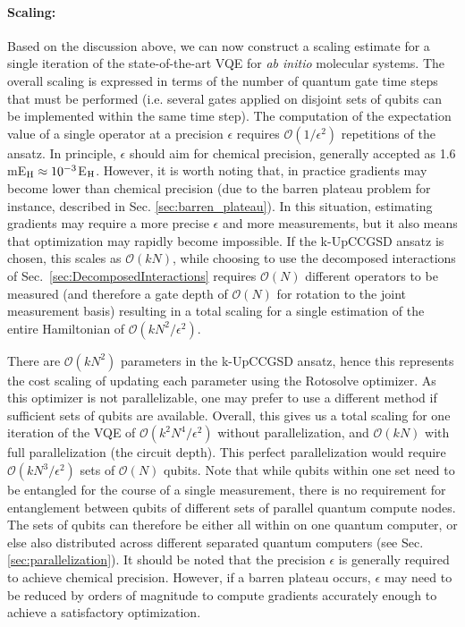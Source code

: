 \paragraph{Scaling:} Based on the discussion above, we can now construct a scaling estimate for a single iteration of the state-of-the-art VQE for \textit{ab initio} molecular systems. The overall scaling is expressed in terms of the number of quantum gate time steps that must be performed (i.e. several gates applied on disjoint sets of qubits can be implemented within the same time step). The computation of the expectation value of a single operator at a precision $\epsilon$ requires $\mathcal{O}(1/\epsilon^2)$ repetitions of the ansatz. In principle, $\epsilon$ should aim for chemical precision, generally accepted as 1.6 mE$_{\rm H} \approx 10^{-3} $E$_{\rm H}$. However, it is worth noting that, in practice gradients may become lower than chemical precision (due to the barren plateau problem for instance, described in Sec. \ref{sec:barren_plateau}). In this situation, estimating gradients may require a more precise $\epsilon$ and more measurements, but it also means that optimization may rapidly become impossible.  
If the k-UpCCGSD ansatz is chosen, this scales as $\mathcal{O}(kN)$, while choosing to use the decomposed interactions of Sec.~\ref{sec:DecomposedInteractions} requires $\mathcal{O}(N)$ different operators to be measured (and therefore a gate depth of $\mathcal{O}(N)$ for rotation to the joint measurement basis) resulting in a total scaling for a single estimation of the entire Hamiltonian of $\mathcal{O}(kN^2/\epsilon^2)$. 

There are $\mathcal{O}(kN^2)$ parameters in the k-UpCCGSD ansatz, hence this represents the cost scaling of updating each parameter using the Rotosolve optimizer. As this optimizer is not parallelizable, one may prefer to use a different method if sufficient sets of qubits are available. Overall, this gives us a total scaling for one iteration of the VQE of $\mathcal{O}(k^2N^4/\epsilon^2)$ without parallelization, and $\mathcal{O}(kN)$ with full parallelization (the circuit depth). This perfect parallelization would require $\mathcal{O}(kN^3/\epsilon^2)$ sets of $\mathcal{O}(N)$ qubits. Note that while qubits within one set need to be entangled for the course of a single measurement, there is no requirement for entanglement between qubits of different sets of parallel quantum compute nodes. The sets of qubits can therefore be either all within on one quantum computer, or else also distributed across different separated quantum computers (see Sec. \ref{sec:parallelization}). It should be noted that the precision $\epsilon$ is generally required to achieve chemical precision. However, if a barren plateau occurs, $\epsilon$ may need to be reduced by orders of magnitude to compute gradients accurately enough to achieve a satisfactory optimization.

